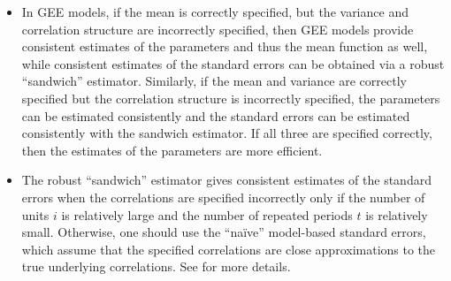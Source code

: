 \begin{itemize}
\item In GEE models, if the mean is correctly specified, but the variance and correlation structure are incorrectly specified, then GEE models provide consistent estimates of the parameters and thus the mean function as well, while consistent estimates of the standard errors can be obtained via a robust ``sandwich'' estimator.  Similarly, if the mean and variance are correctly specified but the correlation structure is incorrectly specified, the parameters can be estimated consistently and the standard errors can be estimated consistently with the sandwich estimator.  If all three are specified correctly, then the estimates of the parameters are more efficient.

\item The robust ``sandwich'' estimator gives consistent estimates of the standard errors when the correlations are specified incorrectly only if the number of units $i$ is relatively large and the number of repeated periods $t$ is relatively small.  Otherwise, one should use the ``na\"{i}ve'' model-based standard errors, which assume that the specified correlations are close approximations to the true underlying correlations.  See \citet{FitLaiWar04} for more details.

\end{itemize}



